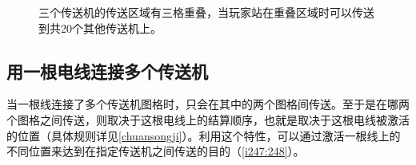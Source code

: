 \begin{figure}[!h]
\begin{center}
\qquad
{}
\end{center}
\caption{三个传送机的传送区域有三格重叠，当玩家站在重叠区域时可以传送到共20个其他传送机上。}
\label{i245:246}
\end{figure}

\subsection{用一根电线连接多个传送机}
当一根线连接了多个传送机图格时，只会在其中的两个图格间传送。至于是在哪两个图格之间传送，则取决于这根电线上的结算顺序，也就是取决于这根电线被激活的位置（具体规则详见\autoref{chuansongji}）。利用这个特性，可以通过激活一根线上的不同位置来达到在指定传送机之间传送的目的（\autoref{i247:248}）。

